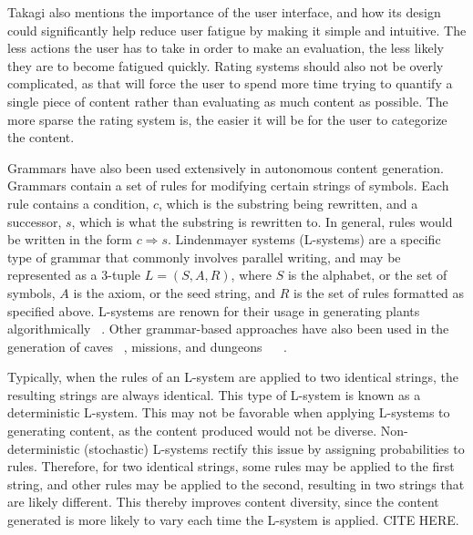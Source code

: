 \documentclass[letterpaper, 10 pt, conference]{ieeeconf}
\begin{document}
\par
Takagi also mentions the importance of the user interface, and how its design could significantly help reduce user fatigue by making it simple and intuitive. The less actions the user has to take in order to make an evaluation, the less likely they are to become fatigued quickly. Rating systems should also not be overly complicated, as that will force the user to spend more time trying to quantify a single piece of content rather than evaluating as much content as possible. The more sparse the rating system is, the easier it will be for the user to categorize the content.
\par
Grammars have also been used extensively in autonomous content generation. Grammars contain a set of rules for modifying certain strings of symbols. Each rule contains a condition, $c$, which is the substring being rewritten, and a successor, $s$, which is what the substring is rewritten to. In general, rules would be written in the form $c \Rightarrow s$. Lindenmayer systems (L-systems) are a specific type of grammar that commonly involves parallel writing, and may be represented as a 3-tuple $L = (S, A, R)$, where $S$ is the alphabet, or the set of symbols, $A$ is the axiom, or the seed string, and $R$ is the set of rules formatted as specified above. L-systems are renown for their usage in generating plants algorithmically ~\cite{prus2015beauty}. Other grammar-based approaches have also been used in the generation of caves ~\cite{mark2015procedural}, missions, and dungeons ~\cite{dormans2010adventures} ~\cite{dormans2011generating}.
\par
Typically, when the rules of an L-system are applied to two identical strings, the resulting strings are always identical. This type of L-system is known as a deterministic L-system. This may not be favorable when applying L-systems to generating content, as the content produced would not be diverse. Non-deterministic (stochastic) L-systems rectify this issue by assigning probabilities to rules. Therefore, for two identical strings, some rules may be applied to the first string, and other rules may be applied to the second, resulting in two strings that are likely different. This thereby improves content diversity, since the content generated is more likely to vary each time the L-system is applied. CITE HERE.  
\par
\end{document}
